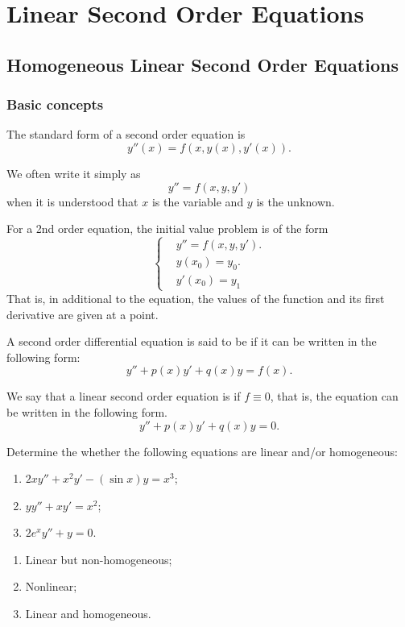 \chapter{Linear Second Order Equations}

\section{Homogeneous Linear Second Order Equations}

\subsection{Basic concepts}
The standard form of a second order equation is 
\[y''(x) = f(x,y(x),y'(x)).\]

We often write it simply as 
\[y''= f(x,y,y')\]
when it is understood that $x$ is the variable and $y$ is the unknown.

For a 2nd order equation, the initial value problem is of the form
\[
  \begin{cases}
    & y''= f(x,y,y').\\[0.5em]
    & y(x_0)   =   y_0.\\[0.5em]
    & y'(x_0) = y_1
  \end{cases}
\]
That is, in additional to the equation, the values of the function and its first derivative are given at a point.

A second order differential equation is said to be  if it can be written in the following form:
\[y'' + p(x) y' + q(x) y = f(x).\]

We say that a linear second order equation is  if $f\equiv0$, that is, the equation can be written in the following form.
\[y'' + p(x) y' + q(x) y = 0.\]

\begin{example}
Determine the whether the following equations are linear and/or homogeneous: 
\begin{enumerate}
	\item $2xy''+x^2y'-(\sin x)y=x^3$;  
	\item $yy''+xy'=x^2$;
	\item $2e^xy''+y=0$.
\end{enumerate}  
\end{example}
\begin{solution}
  \begin{enumerate}
    \item Linear but non-homogeneous;
    \item Nonlinear;
    \item Linear and homogeneous.
  \end{enumerate}	
\end{solution}

